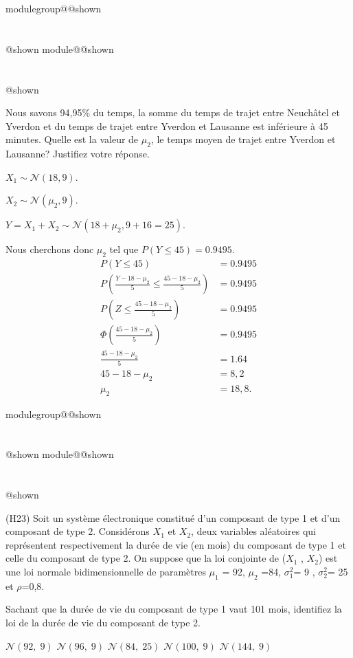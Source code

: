 \documentclass{Evaluation}
\makeatletter
\newcommand{\currentmodulekey}{}
\newcommand{\currentmoduletitle}{}
\newcommand{\currentgroupkey}{}
\newcommand{\currentgrouptitle}{}
\newcommand{\showmoduleifneeded}{%
  \ifx\currentgroupkey\empty\else
    \expandafter\ifx\csname modulegroup@\currentgroupkey @shown\endcsname\relax
      \section*{\currentgrouptitle}%
      \expandafter\gdef\csname modulegroup@\currentgroupkey @shown\endcsname{1}%
    \fi
  \fi
  \expandafter\ifx\csname module@\currentmodulekey @shown\endcsname\relax
    \section*{\currentmoduletitle}%
    \expandafter\gdef\csname module@\currentmodulekey @shown\endcsname{1}%
  \fi
}
\newenvironment{A22}{\showmoduleifneeded}{}
\newenvironment{H23}{\showmoduleifneeded}{}
\makeatother
\begin{document}
\begin{questions}
\begin{A22}
\begin{parts}
Nous savons 94,95\% du temps,  la somme du temps de trajet entre Neuchâtel et Yverdon  et du temps de trajet entre Yverdon et Lausanne est inférieure à 45 minutes. 
Quelle est la valeur de $\mu_2$, le temps moyen de trajet entre Yverdon et Lausanne? Justifiez votre réponse.

\smallskip
\smallskip    
\begin{solution}
    $X_1\sim\mathcal{N}(18, 9)$.

    $X_2\sim\mathcal{N}(\mu_2, 9)$.

    $Y = X_1 + X_2 \sim \mathcal{N}(18+\mu_2, 9+16=25)$.
    
    Nous cherchons donc $\mu_2$ tel que $P(Y\leq 45)=0.9495$.
    \begin{align*}
    P(Y\leq 45)&=0.9495\\
    P\left(\frac{Y-18-\mu_2}{5} \leq\frac{45-18-\mu_2}{5}\right)&= 0.9495\\
    P\left(Z \leq \frac{45-18-\mu_2}{5}\right)&=0.9495\\
    \Phi\left(\frac{45 - 18 - \mu_2}{5}\right)&=0.9495\\
    \frac{45-18-\mu_2}{5}&=1.64\\
    45-18-\mu_2&= 8,2\\
    \mu_2 &= 18,8.
    \end{align*}
\end{solution}
\end{parts}

\end{A22}

\begin{H23}
\question
(H23)
Soit un système électronique constitué d'un composant de type 1 et d'un composant de type 2. Considérons ${X}_1 $ et ${X}_2 $, deux variables aléatoires qui représentent respectivement la durée de vie (en mois) du composant de type 1 et celle du composant de type 2. On suppose que la loi conjointe de (${X}_1 $ , ${X}_2 $) est une loi normale bidimensionnelle de paramètres ${\mu}_1 $ = 92, ${\mu}_2 $ =84, ${\sigma}_1 ^2$= 9 , ${\sigma}_2 ^2$=  25 et $\rho $=0,8.

Sachant que la durée de vie du composant de type 1 vaut 101 mois, identifiez la loi de la durée de vie du composant de type 2.

 \begin{oneparcheckboxes}
		\choice $\mathcal{N}(92, \; 9)$  %
		\correctchoice $\mathcal{N}(96,\;9)$ %
		\choice $\mathcal{N}(84,\; 25)$ %
		\choice $\mathcal{N}(100, \; 9)$ %
		\choice $\mathcal{N}(144, \; 9)$ %
\end{oneparcheckboxes}


\end{H23}
\end{questions}
\end{document}
